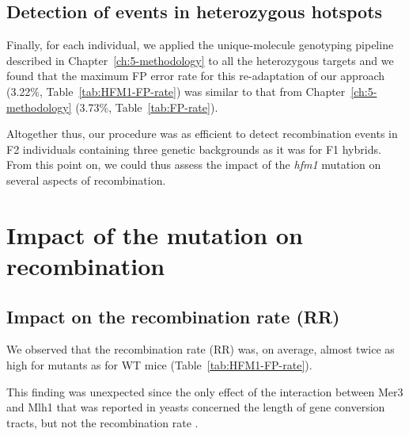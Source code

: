 

\subsection{Detection of events in heterozygous hotspots}

Finally, for each individual, we applied the unique-molecule genotyping pipeline described in Chapter~\ref{ch:5-methodology} to all the heterozygous targets and we found that the maximum FP error rate for this re-adaptation of our approach (3.22\%, Table~\ref{tab:HFM1-FP-rate}) was similar to that from Chapter~\ref{ch:5-methodology} (3.73\%, Table~\ref{tab:FP-rate}).

Altogether thus, our procedure was as efficient to detect recombination events in F2 individuals containing three genetic backgrounds as it was for F1 hybrids.
From this point on, we could thus assess the impact of the \textit{hfm1} mutation on several aspects of recombination.







\section{Impact of the mutation on recombination}
\subsection{Impact on the recombination rate (RR)}
\label{chap8:recombination-rate}

We observed that the recombination rate (RR) was, on average, almost twice as high for mutants as for WT mice (Table~\ref{tab:HFM1-FP-rate}).
\begin{mccorrection}
This finding was unexpected since the only effect of the interaction between Mer3 and Mlh1 that was reported in yeasts concerned the length of gene conversion tracts, but not the recombination rate \citep{duroc2017concerted}.
\end{mccorrection}

